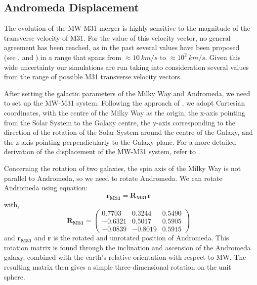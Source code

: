 \documentclass[a4paper,12pt, english]{article}
\begin{document}
\subsection{Andromeda Displacement}
\label{m31-displacement}
The evolution of the MW-M31 merger is highly sensitive to the magnitude of the transverse velocity of M31. For the value of this velocity vector, no general agreement has been reached, as in the past several values have been proposed (see \textcite{van_der_Marel_2012b}, \textcite{Salomon_2016} and \textcite{van_der_Marel_2019}) in a range that spans from \(\approx 10\: km/s\) to \(\approx 10^2\: km/s\). Given this wide uncertainty our simulations are run taking into consideration several values from the range of possible M31 transverse velocity vectors.\par
\smallskip
After setting the galactic parameters of the Milky Way and Andromeda, we need to set up the MW-M31 system. Following the approach of \textcite{van_der_Marel_2008}, we adopt Cartesian coordinates, with the centre of the Milky Way as the origin, the x-axis pointing from the Solar System to the Galaxy centre, the y-axis corresponding to the direction of the rotation of the Solar System around the centre of the Galaxy, and the z-axis pointing perpendicularly to the Galaxy plane. For a more detailed derivation of the displacement of the MW-M31 system, refer to \textcite{Withagen_2019}.\par
\smallskip
Concerning the rotation of two galaxies, the spin axis of the Milky Way is not parallel to Andromeda, so we need to rotate Andromeda. We can rotate Andromeda using equation:
\begin{equation}
    \boldsymbol{r_{M31}} = \boldsymbol{R_{M31}r}
\end{equation}
with,
\begin{equation}
    \boldsymbol{R_{M31}} = \left(\begin{array}{ccc}
         0.7703 & 0.3244 & 0.5490 \\
         -0.6321 & 0.5017 & 0.5905 \\
         -0.0839 & -0.8019 & 0.5915
    \end{array}\right)
\end{equation}
and $ \boldsymbol{r_{M31}} $ and $ \boldsymbol{r} $ is the rotated and unrotated position of Andromeda. This rotation matrix is found through the inclination and ascension of the Andromeda galaxy, combined with the earth's relative orientation with respect to MW. The resulting matrix then gives a simple three-dimensional rotation on the unit sphere.\par
\end{document}
